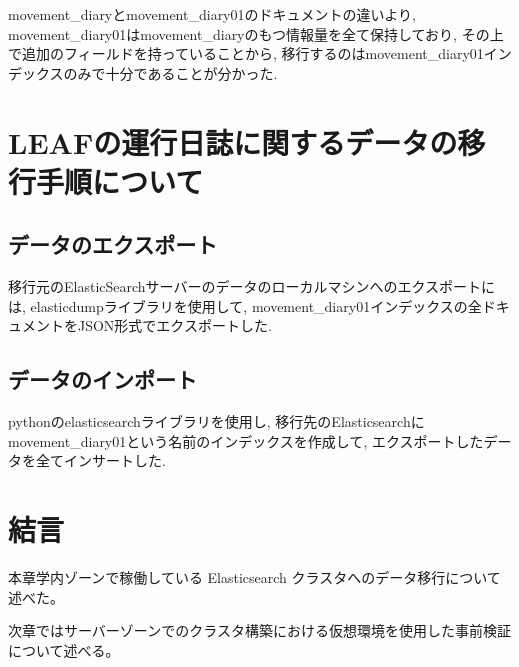movement\_diaryとmovement\_diary01のドキュメントの違いより, movement\_diary01はmovement\_diaryのもつ情報量を全て保持しており, その上で追加のフィールドを持っていることから, 移行するのはmovement\_diary01インデックスのみで十分であることが分かった.

\section{LEAFの運行日誌に関するデータの移行手順について}

\subsection{データのエクスポート}
移行元のElasticSearchサーバーのデータのローカルマシンへのエクスポートには, elasticdumpライブラリを使用して, movement\_diary01インデックスの全ドキュメントをJSON形式でエクスポートした.

\subsection{データのインポート}
pythonのelasticsearchライブラリを使用し, 移行先のElasticsearchにmovement\_diary01という名前のインデックスを作成して, エクスポートしたデータを全てインサートした.

\section{結言}
本章学内ゾーンで稼働している Elasticsearch クラスタへのデータ移行について述べた。

次章ではサーバーゾーンでのクラスタ構築における仮想環境を使用した事前検証について述べる。